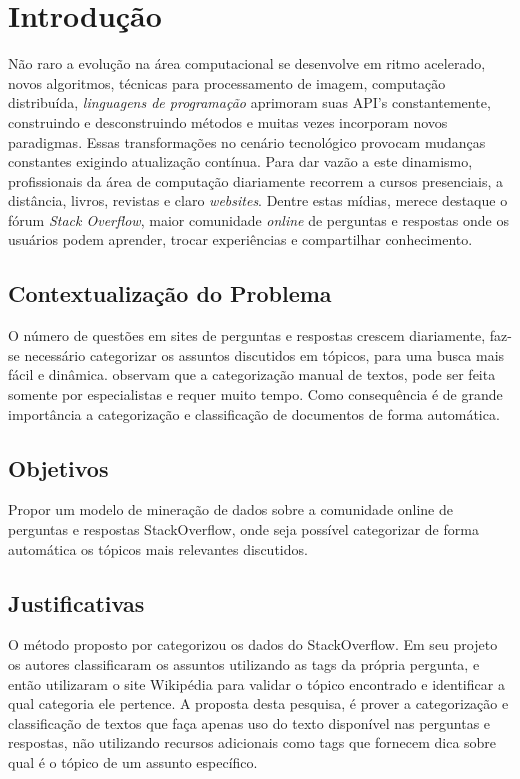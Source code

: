 \documentclass[10pt,a4paper,final]{article}
\begin{document}
    \folhaDeRosto

    \plano
    
    \section{Introdução}
    
    Não raro a evolução na área computacional se desenvolve em ritmo acelerado, novos algoritmos, técnicas para processamento de imagem, computação distribuída, \emph{linguagens de programação} aprimoram suas API's constantemente, construindo e desconstruindo métodos e muitas vezes incorporam novos paradigmas. Essas transformações no cenário tecnológico provocam mudanças constantes exigindo atualização contínua.
	Para dar vazão a este dinamismo, profissionais da área de computação diariamente recorrem a cursos presenciais, a distância, livros, revistas e claro \textit{websites}. Dentre estas mídias, merece destaque o fórum \textit{Stack Overflow}, maior comunidade \textit{online} de perguntas e respostas onde os usuários podem aprender, trocar experiências e compartilhar conhecimento.
    
    \subsection{Contextualização do Problema}
    O número de questões em sites de perguntas e respostas crescem diariamente, faz-se necessário categorizar os assuntos discutidos em tópicos, para uma busca mais fácil e dinâmica.  \cite{Yasotha2016} observam que a categorização manual de textos, pode ser feita somente por especialistas e requer muito tempo. Como consequência é de grande importância a categorização e classificação de documentos de forma automática.

    \subsection{Objetivos}
Propor um modelo de mineração de dados sobre a comunidade online de perguntas e respostas StackOverflow, onde seja possível categorizar de forma automática os tópicos mais relevantes discutidos.

    \subsection{Justificativas}

O método proposto por \cite{Arash2016} categorizou os dados do StackOverflow. Em seu projeto os autores classificaram os assuntos utilizando as tags da própria pergunta, e então utilizaram o site Wikipédia para validar o tópico encontrado e identificar a qual categoria ele pertence. A proposta desta pesquisa, é prover a categorização e classificação de textos que faça apenas uso do texto disponível nas perguntas e respostas, não utilizando recursos adicionais como tags que fornecem dica sobre qual é o tópico de um assunto específico.
\end{document}
